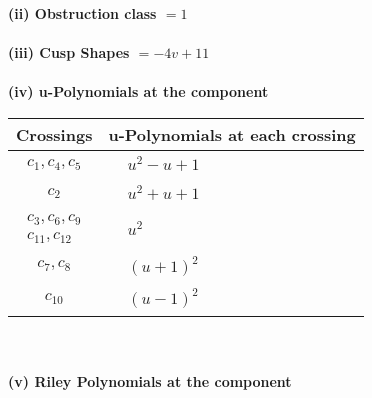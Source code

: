 \documentclass[1p]{elsarticle_modified}
\theoremstyle{definition}
\begin{document}
\flushleft \textbf{(ii) Obstruction class $= 1$}\\~\\
\flushleft \textbf{(iii) Cusp Shapes $= -4 v+11$}\\~\\
\newpage\renewcommand{\arraystretch}{1}
\flushleft \textbf{(iv) u-Polynomials at the component}\newline \\
\begin{tabular}{m{50pt}|m{274pt}}
Crossings & \hspace{64pt}u-Polynomials at each crossing \\
\hline $$\begin{aligned}c_{1},c_{4},c_{5}\end{aligned}$$&$\begin{aligned}
&u^2- u+1
\end{aligned}$\\
\hline $$\begin{aligned}c_{2}\end{aligned}$$&$\begin{aligned}
&u^2+u+1
\end{aligned}$\\
\hline $$\begin{aligned}c_{3},c_{6},c_{9}\\c_{11},c_{12}\end{aligned}$$&$\begin{aligned}
&u^2
\end{aligned}$\\
\hline $$\begin{aligned}c_{7},c_{8}\end{aligned}$$&$\begin{aligned}
&(u+1)^2
\end{aligned}$\\
\hline $$\begin{aligned}c_{10}\end{aligned}$$&$\begin{aligned}
&(u-1)^2
\end{aligned}$\\
\hline
\end{tabular}\\~\\
\newpage\renewcommand{\arraystretch}{1}
\flushleft \textbf{(v) Riley Polynomials at the component}\newline \\
\end{document}
